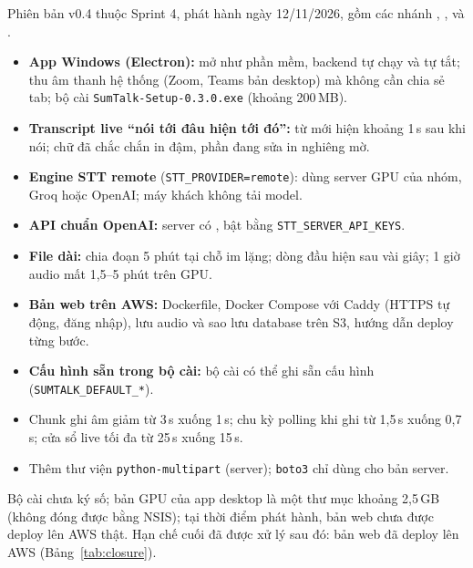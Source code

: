 \documentclass[12pt,a4paper]{report}
\begin{document}
\begin{sloppypar}
Phiên bản v0.4 thuộc Sprint 4, phát hành ngày 12/11/2026, gồm các nhánh ,
,  và .
\end{sloppypar}

\begin{sloppypar}
\begin{itemize}
  \item \textbf{App Windows (Electron):} mở như phần mềm, backend tự chạy và tự tắt; thu âm thanh hệ thống (Zoom,
        Teams bản desktop) mà không cần chia sẻ tab; bộ cài \texttt{SumTalk-Setup-0.3.0.exe} (khoảng 200\,MB).
  \item \textbf{Transcript live ``nói tới đâu hiện tới đó'':} từ mới hiện khoảng 1\,s sau khi nói; chữ đã chắc chắn
        in đậm, phần đang sửa in nghiêng mờ.
  \item \textbf{Engine STT remote} (\texttt{STT\_PROVIDER=remote}): dùng server GPU của nhóm, Groq hoặc OpenAI; máy
        khách không tải model.
  \item \textbf{API chuẩn OpenAI:} server có , bật bằng \texttt{STT\_SERVER\_API\_KEYS}.
  \item \textbf{File dài:} chia đoạn 5 phút tại chỗ im lặng; dòng đầu hiện sau vài giây; 1 giờ audio mất 1,5--5 phút
        trên GPU.
  \item \textbf{Bản web trên AWS:} Dockerfile, Docker Compose với Caddy (HTTPS tự động, đăng nhập), lưu audio và sao
        lưu database trên S3, hướng dẫn deploy từng bước.
  \item \textbf{Cấu hình sẵn trong bộ cài:} bộ cài có thể ghi sẵn cấu hình (\texttt{SUMTALK\_DEFAULT\_*}).
\end{itemize}
\end{sloppypar}

\begin{itemize}
  \item Chunk ghi âm giảm từ 3\,s xuống 1\,s; chu kỳ polling khi ghi từ 1,5\,s xuống 0,7\,s; cửa sổ live tối đa từ
        25\,s xuống 15\,s.
  \item Thêm thư viện \texttt{python-multipart} (server); \texttt{boto3} chỉ dùng cho bản server.
\end{itemize}

Bộ cài chưa ký số; bản GPU của app desktop là một thư mục khoảng 2,5\,GB (không đóng được bằng NSIS); tại thời
điểm phát hành, bản web chưa được deploy lên AWS thật. Hạn chế cuối đã được xử lý sau đó: bản web đã deploy lên AWS
(Bảng~\ref{tab:closure}).
\end{document}
